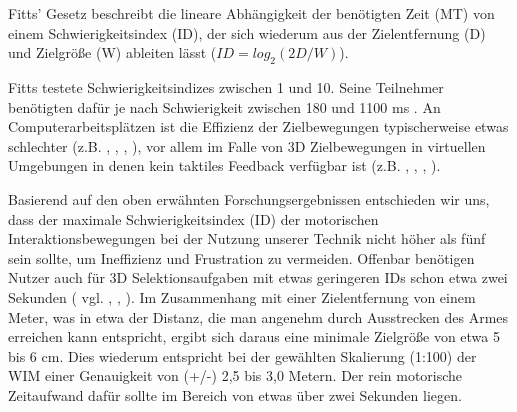 Fitts' Gesetz beschreibt die lineare Abhängigkeit der benötigten Zeit (MT) von einem
Schwierigkeitsindex (ID), der sich wiederum aus der Zielentfernung (D) und Zielgröße (W) ableiten lässt ($ID=log_2(2D/W)$).

Fitts testete Schwierigkeitsindizes zwischen 1 und 10. Seine Teilnehmer benötigten dafür je nach Schwierigkeit zwischen 180 und 1100 ms \cite{fitts1954information}. An Computerarbeitsplätzen ist die Effizienz der Zielbewegungen typischerweise etwas schlechter (z.B. \cite{Forlines}, \cite{mackenzie1992fitts}, \cite{MacKenzie:2008:FTS:1357054.1357308}, \cite{Wobbrock:2008:EMP:1357054.1357306}), vor 
allem im Falle von 3D Zielbewegungen in virtuellen Umgebungen in denen kein taktiles Feedback verfügbar ist (z.B. \cite{arsenault2004importance}, \cite{grossman2004pointing}, \cite{teather2011pointing}, \cite{lubos2014analysis}).

Basierend auf den oben erwähnten Forschungsergebnissen entschieden wir
uns, dass der maximale Schwierigkeitsindex (ID) der motorischen
Interaktionsbewegungen bei der Nutzung unserer Technik nicht höher als fünf sein sollte, um Ineffizienz und Frustration zu vermeiden. Offenbar benötigen Nutzer auch für 3D Selektionsaufgaben mit etwas geringeren IDs schon etwa zwei Sekunden ( vgl. \cite{grossman2004pointing}, \cite{teather2011pointing}, \cite{lubos2014analysis}). Im Zusammenhang mit einer Zielentfernung von einem Meter, was in etwa der Distanz, die man angenehm durch Ausstrecken des Armes erreichen kann entspricht, ergibt sich daraus eine minimale Zielgröße von etwa 5 bis 6 cm. Dies wiederum entspricht bei der gewählten Skalierung (1:100) der WIM einer Genauigkeit von (+/-) 2,5 bis 3,0 Metern. Der rein motorische Zeitaufwand dafür sollte im Bereich von etwas über zwei Sekunden liegen.



